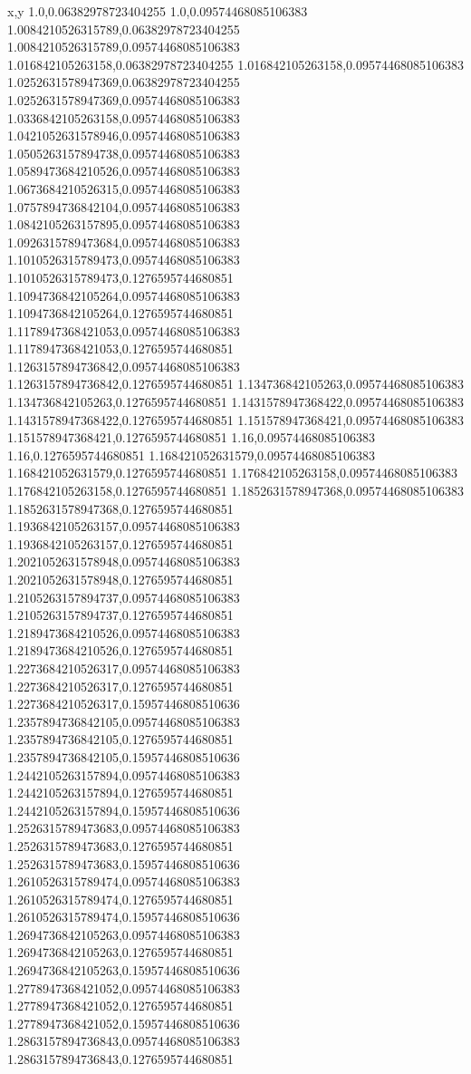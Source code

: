 x,y
1.0,0.06382978723404255
1.0,0.09574468085106383
1.0084210526315789,0.06382978723404255
1.0084210526315789,0.09574468085106383
1.016842105263158,0.06382978723404255
1.016842105263158,0.09574468085106383
1.0252631578947369,0.06382978723404255
1.0252631578947369,0.09574468085106383
1.0336842105263158,0.09574468085106383
1.0421052631578946,0.09574468085106383
1.0505263157894738,0.09574468085106383
1.0589473684210526,0.09574468085106383
1.0673684210526315,0.09574468085106383
1.0757894736842104,0.09574468085106383
1.0842105263157895,0.09574468085106383
1.0926315789473684,0.09574468085106383
1.1010526315789473,0.09574468085106383
1.1010526315789473,0.1276595744680851
1.1094736842105264,0.09574468085106383
1.1094736842105264,0.1276595744680851
1.1178947368421053,0.09574468085106383
1.1178947368421053,0.1276595744680851
1.1263157894736842,0.09574468085106383
1.1263157894736842,0.1276595744680851
1.134736842105263,0.09574468085106383
1.134736842105263,0.1276595744680851
1.1431578947368422,0.09574468085106383
1.1431578947368422,0.1276595744680851
1.151578947368421,0.09574468085106383
1.151578947368421,0.1276595744680851
1.16,0.09574468085106383
1.16,0.1276595744680851
1.168421052631579,0.09574468085106383
1.168421052631579,0.1276595744680851
1.176842105263158,0.09574468085106383
1.176842105263158,0.1276595744680851
1.1852631578947368,0.09574468085106383
1.1852631578947368,0.1276595744680851
1.1936842105263157,0.09574468085106383
1.1936842105263157,0.1276595744680851
1.2021052631578948,0.09574468085106383
1.2021052631578948,0.1276595744680851
1.2105263157894737,0.09574468085106383
1.2105263157894737,0.1276595744680851
1.2189473684210526,0.09574468085106383
1.2189473684210526,0.1276595744680851
1.2273684210526317,0.09574468085106383
1.2273684210526317,0.1276595744680851
1.2273684210526317,0.15957446808510636
1.2357894736842105,0.09574468085106383
1.2357894736842105,0.1276595744680851
1.2357894736842105,0.15957446808510636
1.2442105263157894,0.09574468085106383
1.2442105263157894,0.1276595744680851
1.2442105263157894,0.15957446808510636
1.2526315789473683,0.09574468085106383
1.2526315789473683,0.1276595744680851
1.2526315789473683,0.15957446808510636
1.2610526315789474,0.09574468085106383
1.2610526315789474,0.1276595744680851
1.2610526315789474,0.15957446808510636
1.2694736842105263,0.09574468085106383
1.2694736842105263,0.1276595744680851
1.2694736842105263,0.15957446808510636
1.2778947368421052,0.09574468085106383
1.2778947368421052,0.1276595744680851
1.2778947368421052,0.15957446808510636
1.2863157894736843,0.09574468085106383
1.2863157894736843,0.1276595744680851
